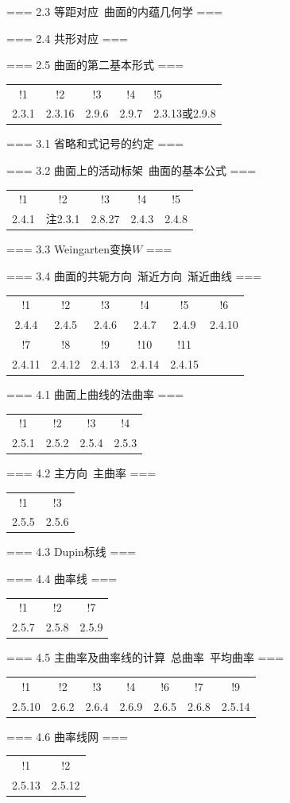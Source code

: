 === 2.3 等距对应\ 曲面的内蕴几何学 ===

=== 2.4 共形对应 ===

=== 2.5 曲面的第二基本形式 ===
\begin{tabular}{cccc}!1&!2&!3&!4&!5\\
    2.3.1&2.3.16&2.9.6&2.9.7&2.3.13或2.9.8\end{tabular}

=== 3.1 省略和式记号的约定 ===

=== 3.2 曲面上的活动标架\ 曲面的基本公式 ===
\begin{tabular}{ccccc}
    !1&!2&!3&!4&!5\\
    2.4.1&注2.3.1&2.8.27&2.4.3&2.4.8
\end{tabular}

=== 3.3 Weingarten变换$W$ ===

=== 3.4 曲面的共轭方向\ 渐近方向\ 渐近曲线 ===
\begin{tabular}{cccccc}
    !1&!2&!3&!4&!5&!6\\
    2.4.4&2.4.5&2.4.6&2.4.7&2.4.9&2.4.10\\
    !7&!8&!9&!10&!11\\
    2.4.11&2.4.12&2.4.13&2.4.14&2.4.15
\end{tabular}

=== 4.1 曲面上曲线的法曲率 ===
\begin{tabular}{cccc}
    !1&!2&!3&!4\\2.5.1&2.5.2&2.5.4&2.5.3
\end{tabular}

=== 4.2 主方向\ 主曲率 ===
\begin{tabular}{cc}!1&!3\\2.5.5&2.5.6\end{tabular}

=== 4.3 Dupin标线 ===

=== 4.4 曲率线 ===
\begin{tabular}{ccc}!1&!2&!7\\2.5.7&2.5.8&2.5.9\end{tabular}

=== 4.5 主曲率及曲率线的计算\ 总曲率\ 平均曲率 ===
\begin{tabular}{ccccccc}
    !1&!2&!3&!4&!6&!7&!9\\
    2.5.10&2.6.2&2.6.4&2.6.9&2.6.5&2.6.8&2.5.14
\end{tabular}

=== 4.6 曲率线网 ===
\begin{tabular}{cc}
    !1&!2\\2.5.13&2.5.12
\end{tabular}

